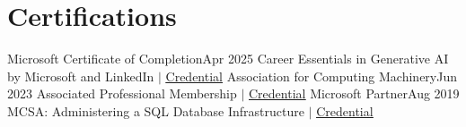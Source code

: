 \documentclass[UTF8]{ctexart} %
\begin{document}
\section{Certifications}
\resumeSubHeadingListStart
    \resumeSubheading
        {Microsoft Certificate of Completion}{Apr 2025}
        {Career Essentials in Generative AI by Microsoft and LinkedIn $|$ \href{https://bit.ly/3xyz123}{\underline{Credential}}}{}
    \resumeSubheading
        {Association for Computing Machinery}{Jun 2023}
        {Associated Professional Membership $|$ \href{https://bit.ly/4aBcDeF}{\underline{Credential}}}{}
    \resumeSubheading
        {Microsoft Partner}{Aug 2019}
        {MCSA: Administering a SQL Database Infrastructure $|$ \href{https://bit.ly/3zYxWvN}{\underline{Credential}}}{}
\resumeSubHeadingListEnd
\end{document}
